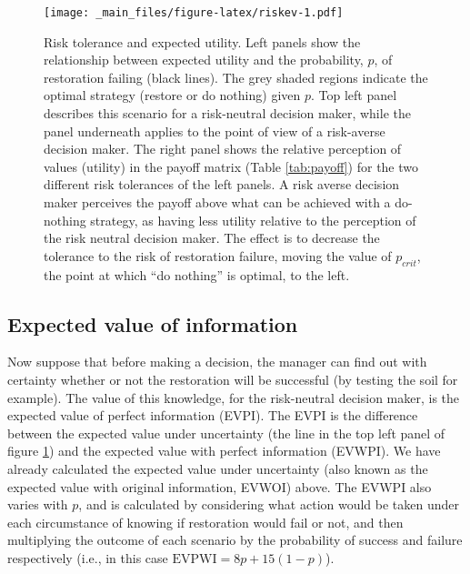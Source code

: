 \documentclass[]{article}
\theoremstyle{definition}
\theoremstyle{definition}
\theoremstyle{definition}
\theoremstyle{remark}
\begin{document}
\begin{figure}[htbp]
\centering
\texttt{[image: \_main\_files/figure-latex/riskev-1.pdf]}
\caption{\label{fig:riskev}Risk tolerance and expected utility. Left panels show the
relationship between expected utility and the probability, \(p\), of
restoration failing (black lines). The grey shaded regions indicate the
optimal strategy (restore or do nothing) given \(p\). Top left panel
describes this scenario for a risk-neutral decision maker, while the
panel underneath applies to the point of view of a risk-averse decision
maker. The right panel shows the relative perception of values (utility)
in the payoff matrix (Table \ref{tab:payoff}) for the two different risk
tolerances of the left panels. A risk averse decision maker perceives
the payoff above what can be achieved with a do-nothing strategy, as
having less utility relative to the perception of the risk neutral
decision maker. The effect is to decrease the tolerance to the risk of
restoration failure, moving the value of \(p_\textit{crit}\), the point
at which ``do nothing'' is optimal, to the left.}
\end{figure}

\subsection*{Expected value of
information}\label{expected-value-of-information}

Now suppose that before making a decision, the manager can find out with
certainty whether or not the restoration will be successful (by testing
the soil for example). The value of this knowledge, for the risk-neutral
decision maker, is the expected value of perfect information (EVPI). The
EVPI is the difference between the expected value under uncertainty (the
line in the top left panel of figure \ref{fig:riskev}) and the expected
value with perfect information (EVWPI). We have already calculated the
expected value under uncertainty (also known as the expected value with
original information, EVWOI) above. The EVWPI also varies with \(p\),
and is calculated by considering what action would be taken under each
circumstance of knowing if restoration would fail or not, and then
multiplying the outcome of each scenario by the probability of success
and failure respectively (i.e., in this case
\(\mathrm{EVPWI} = 8p + 15(1-p)\)).
\end{document}

